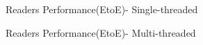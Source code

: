 \documentclass[sigconf,nonacm,screen]{acmart}
\begin{document}
   
    
    
    \begin{figure}[h]
        \centering
        
        \caption{Readers Performance(EtoE)- Single-threaded}
    \end{figure}


    \begin{figure}[h]
        \centering
        
        \caption{Readers Performance(EtoE)- Multi-threaded}
    \end{figure}    
\end{document}

